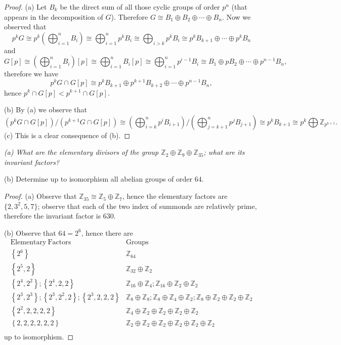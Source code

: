 \begin{proof}
(a) Let $B_k$ be the direct sum of all those cyclic groups of order $p^n$ (that appears in the decomposition of $G$). Therefore $G\cong B_1\oplus B_2\oplus\cdots\oplus B_n$. Now we observed that 
$$
p^kG\cong p^k\left( \bigoplus_{i=1}^n{B_i} \right) \cong \bigoplus_{i=1}^n{p^kB_i}\cong \bigoplus_{i>k}{p^kB_i}\cong p^kB_{k+1}\oplus \cdots \oplus p^kB_n
$$
and 
$$
G\left[ p \right] \cong \left( \bigoplus_{i=1}^n{B_i} \right) \left[ p \right] \cong \bigoplus_{i=1}^n{B_i\left[ p \right]}\cong \bigoplus_{i=1}^n{p^{i-1}B_i}\cong B_1\oplus pB_2\oplus \cdots \oplus p^{n-1}B_n,
$$
therefore we have 
$$
p^kG\cap G\left[ p \right] \cong p^kB_{k+1}\oplus p^{k+1}B_{k+2}\oplus \cdots \oplus p^{n-1}B_n,
$$
hence $p^k\cap G[p]<p^{k+1}\cap G[p]$.\par
(b) By (a) we observe that 
$$
\left( p^kG\cap G\left[ p \right] \right) /\left( p^{k+1}G\cap G\left[ p \right] \right) \cong {{\left( \bigoplus_{i=k}^n{p^iB_{i+1}} \right)}/{\left( \bigoplus_{j=k+1}^n{p^jB_{j+1}} \right)}}\cong p^kB_{k+1}\cong p^k\bigoplus{\mathbb{Z} _{p^{k+1}}}.
$$
(c) This is a clear consequence of (b).
\end{proof}
\begin{problem}\em
(a) What are the elementary divisors of the group $\mathbb{Z}_2\oplus\mathbb{Z}_9\oplus\mathbb{Z}_{35}$; what are its invariant factors?\par
(b) Determine up to isomorphism all abelian groups of order $64$.
\end{problem}
\begin{proof}
(a) Observe that $\mathbb{Z}_{35}\cong\mathbb{Z}_5\oplus\mathbb{Z}_7$, hence the elementary factors are $\{2,3^2,5,7\}$; observe that each of the two index of summonds are relatively prime, therefore the invariant factor is $630$.\par
(b) Observe that $64=2^6$, hence there are 
$$
\begin{matrix}
	\mathrm{Elementary}\ \mathrm{Factors}&		\mathrm{Groups}\\
	\left\{ 2^6 \right\}&		\mathbb{Z} _{64}\\
	\left\{ 2^5,2 \right\}&		\mathbb{Z} _{32}\oplus \mathbb{Z} _2\\
	\left\{ 2^4,2^2 \right\} ;\left\{ 2^4,2,2 \right\}&		\mathbb{Z} _{16}\oplus \mathbb{Z} _4;\mathbb{Z} _{16}\oplus \mathbb{Z} _2\oplus \mathbb{Z} _2\\
	\left\{ 2^3,2^3 \right\} ;\left\{ 2^3,2^2,2 \right\} ;\left\{ 2^3,2,2,2 \right\}&		\mathbb{Z} _8\oplus \mathbb{Z} _8;\mathbb{Z} _8\oplus \mathbb{Z} _4\oplus \mathbb{Z} _2;\mathbb{Z} _8\oplus \mathbb{Z} _2\oplus \mathbb{Z} _2\oplus \mathbb{Z} _2\\
	\left\{ 2^2,2,2,2,2 \right\}&		\mathbb{Z} _4\oplus \mathbb{Z} _2\oplus \mathbb{Z} _2\oplus \mathbb{Z} _2\oplus \mathbb{Z} _2\\
	\left\{ 2,2,2,2,2,2 \right\}&		\mathbb{Z} _2\oplus \mathbb{Z} _2\oplus \mathbb{Z} _2\oplus \mathbb{Z} _2\oplus \mathbb{Z} _2\oplus \mathbb{Z} _2\\
\end{matrix}
$$
up to isomorphism.
\end{proof}
